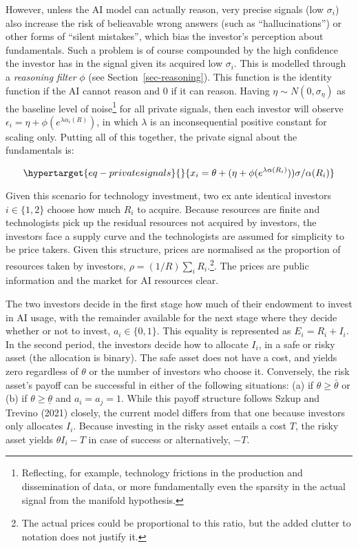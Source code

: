 \documentclass[
]{article}
\theoremstyle{plain}
\theoremstyle{remark}
\begin{document}
However, unless the AI model can actually reason, very precise signals
(low \(\sigma_i\)) also increase the risk of belieavable wrong answers
(such as ``hallucinations'') or other forms of ``silent mistakes'',
which bias the investor's perception about fundamentals. Such a problem
is of course compounded by the high confidence the investor has in the
signal given its acquired low \(\sigma_i\). This is modelled through a
\emph{reasoning filter} \(\phi\) (see Section~\ref{sec-reasoning}). This
function is the identity function if the AI cannot reason and 0 if it
can reason. Having \(\eta \sim N(0, \sigma_\eta)\) as the baseline level
of noise\footnote{Reflecting, for example, technology frictions in the
  production and dissemination of data, or more fundamentally even the
  sparsity in the actual signal from the manifold hypothesis.} for all
private signals, then each investor will observe
\(\epsilon_i = \eta + \phi(e^{\lambda \alpha_i(R)})\), in which
\(\lambda\) is an inconsequential positive constant for scaling only.
Putting all of this together, the private signal about the fundamentals
is:

\begin{equation}\protect\hypertarget{eq-privatesignals}{}{
x_i = \theta + (\eta + \phi(e^{\lambda \alpha(R_i)})) \sigma / \alpha(R_i)
}\label{eq-privatesignals}\end{equation}

Given this scenario for technology investment, two ex ante identical
investors \(i \in \{1,2\}\) choose how much \(R_i\) to acquire. Because
resources are finite and technologists pick up the residual resources
not acquired by investors, the investors face a supply curve and the
technologists are assumed for simplicity to be price takers. Given this
structure, prices are normalised as the proportion of resources taken by
investors, \(\rho = (1/R)\sum_i R_i\).\footnote{The actual prices could
  be proportional to this ratio, but the added clutter to notation does
  not justify it.}. The prices are public information and the market for
AI resources clear.

The two investors decide in the first stage how much of their endowment
to invest in AI usage, with the remainder available for the next stage
where they decide whether or not to invest, \(a_i \in \{0, 1\}\). This
equality is represented as \(E_i = R_i + I_i\). In the second period,
the investors decide how to allocate \(I_i\), in a safe or risky asset
(the allocation is binary). The safe asset does not have a cost, and
yields zero regardless of \(\theta\) or the number of investors who
choose it. Conversely, the risk asset's payoff can be successful in
either of the following situations: (a) if \(\theta \geq \bar{\theta}\)
or (b) if \(\theta \geq \underline{\theta}\) and \(a_i = a_j = 1\).
While this payoff structure follows Szkup and Trevino (2021) closely,
the current model differs from that one because investors only allocates
\(I_i\). Because investing in the risky asset entails a cost \(T\), the
risky asset yields \(\theta I_i - T\) in case of success or
alternatively, \(-T\).
\end{document}
